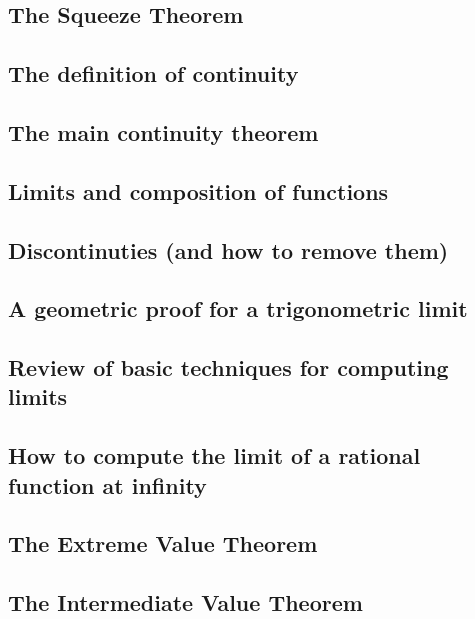 \subsection{The Squeeze Theorem}
\subsection{The definition of continuity}
\subsection{The main continuity theorem}
\subsection{Limits and composition of functions}
\subsection{Discontinuties (and how to remove them)}
\subsection{A geometric proof for a trigonometric limit}
\subsection{Review of basic techniques for computing limits}
\subsection{How to compute the limit of a rational function at infinity}
\subsection{The Extreme Value Theorem}
\subsection{The Intermediate Value Theorem}

